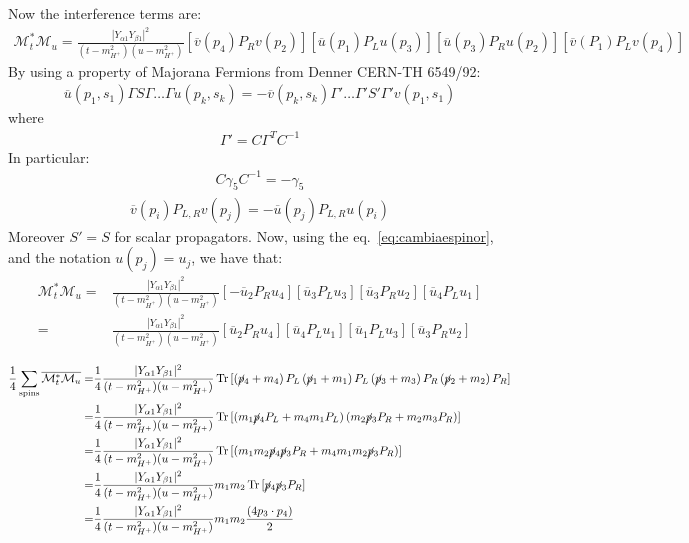 \documentclass[12pt,letterpaper]{article}
\begin{document}
Now the interference terms are:
\begin{align*}
  \mathcal{M}_t^{*} \mathcal{M}_{u}=\frac{|Y_{\alpha 1} Y_{\beta 1}|^2}{(t-m_{H^+}^2)(u-m_{H^+}^2)}
 \left[ \overline{v}(p_4) P_R v(p_2) \right]
 \left[ \overline{u}(p_1) P_L u(p_3) \right]
 \left[ \overline{u}(p_3) P_R u(p_2) \right]
 \left[ \overline{v}(P_1) P_L v(p_4) \right]
\end{align*}
By using a property of Majorana Fermions from Denner CERN-TH 6549/92:
\begin{align*}
\overline{u}(p_1,s_1)\Gamma S\Gamma\ldots \Gamma u(p_k,s_k)
=-\overline{v}(p_k,s_k) \Gamma' \ldots \Gamma' S' \Gamma' v(p_1,s_1)
\end{align*}
where
\begin{align*}
  \Gamma'=C \Gamma^T C^{-1}
\end{align*}
In particular:
\begin{align*}
  C\gamma_5 C^{-1}=-\gamma_5
\end{align*}
\begin{align}
\label{eq:cambiaespinor}
\overline{v}(p_i)P_{L,R}v(p_j)=-\overline{u}(p_j)P_{L,R}u(p_i)
\end{align}
Moreover $S'=S$ for scalar propagators. Now, using the eq.~\eqref{eq:cambiaespinor}, and the notation $u(p_j)=u_j$, we have that:
\begin{align*}
   \mathcal{M}_t^{*} \mathcal{M}_{u}=&\frac{|Y_{\alpha 1} Y_{\beta 1}|^2}{(t-m_{H^+}^2)(u-m_{H^+}^2)}
\left[- \overline{u}_2 P_R u_4 \right]
\left[ \overline{u}_3 P_L u_3 \right]
\left[ \overline{u}_3 P_R u_2 \right]
\left[ \overline{u}_4 P_L u_1 \right]\\
=&\frac{|Y_{\alpha 1} Y_{\beta 1}|^2}{(t-m_{H^+}^2)(u-m_{H^+}^2)}
\left[ \overline{u}_2 P_R u_4 \right]
\left[ \overline{u}_4 P_L u_1 \right]
\left[ \overline{u}_1 P_L u_3 \right]
\left[ \overline{u}_3 P_R u_2 \right]
\end{align*}


\begin{align}
\dfrac{1}{4}\sum_{\text{spins}}  \overline{\mathcal{M}_t^{*} \mathcal{M}_{u}}=&\dfrac{1}{4}\frac{|Y_{\alpha 1} Y_{\beta 1}|^2}{(t-m_{H^+}^2)(u-m_{H^+}^2)}
\operatorname{Tr}\left[ \left( \cancel{p}_4+m_4 \right)P_L
\left( \cancel{p}_1+m_1 \right) P_L
\left( \cancel{p}_3+m_3 \right) P_R
\left( \cancel{p}_2+m_2 \right) P_R
\right]\nonumber\\
=&\dfrac{1}{4}\frac{|Y_{\alpha 1} Y_{\beta 1}|^2}{(t-m_{H^+}^2)(u-m_{H^+}^2)}
\operatorname{Tr}\left[ \left(m_1 \cancel{p}_4P_L + m_4m_1P_L \right)
\left( m_2\cancel{p}_3P_R+m_2m_3P_R \right) \right]\nonumber\\
=&\dfrac{1}{4}\frac{|Y_{\alpha 1} Y_{\beta 1}|^2}{(t-m_{H^+}^2)(u-m_{H^+}^2)}
\operatorname{Tr}\left[ \left(m_1m_2 \cancel{p}_4\cancel{p}_3P_R + m_4m_1m_2\cancel{p}_3P_R \right) \right]\nonumber\\
=&\dfrac{1}{4}\frac{|Y_{\alpha 1} Y_{\beta 1}|^2}{(t-m_{H^+}^2)(u-m_{H^+}^2)}
m_1m_2\operatorname{Tr}\left[ \cancel{p}_4\cancel{p}_3P_R  \right]\nonumber\\
=&\dfrac{1}{4}\frac{|Y_{\alpha 1} Y_{\beta 1}|^2}{(t-m_{H^+}^2)(u-m_{H^+}^2)}
m_1m_2 \dfrac{(4p_3\cdot p_4)}{2}
\end{align}
\end{document}
